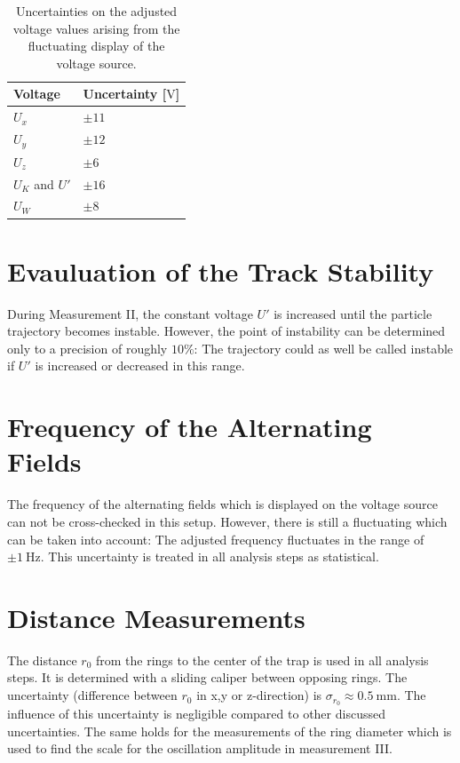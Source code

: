\documentclass[
	paper=A4,
	parskip=full,
	chapterprefix=true,
	11pt,
	headings=normal,
	bibliography=totoc,
	listof=totoc,
	titlepage=on,
]{scrreprt}
\begin{document}
\begin{table}[htbp]
	\centering
	\begin{tabular}{ 
			l
			l
		}
		\toprule
		Voltage & Uncertainty [$\si{\volt}$] \\ 
		\midrule
		$U_x$ & $\pm 11$  \\
		$U_y$ & $\pm 12$ \\
		$U_z$ & $\pm  6$ \\
		$U_K$ and $U'$ & $\pm 16$ \\
		$U_W$ & $\pm 8$ \\
		
		\bottomrule
	\end{tabular}
	\caption{Uncertainties on the adjusted voltage values arising from the fluctuating display of the voltage source.}
	\label{tbl:unc_fluctuation}
\end{table}

\section{Evauluation of the Track Stability}
During Measurement II, the constant voltage $U'$ is increased until the particle trajectory becomes instable. However, the point of instability can be determined only to a precision of roughly $10\%$: The trajectory could as well be called instable if $U'$ is increased or decreased in this range. 
 
\section{Frequency of the Alternating Fields}
The frequency of the alternating fields which is displayed on the voltage source can not be cross-checked in this setup. However, there is still a fluctuating which can be taken into account: The adjusted frequency fluctuates in the range of $\pm \SI{1}{\hertz}$. This uncertainty is treated in all analysis steps as statistical. 

\section{Distance Measurements}
The distance $r_0$ from the rings to the center of the trap is used in all analysis steps. It is determined with a sliding caliper between opposing rings. The uncertainty (difference between $r_0$ in x,y or z-direction) is $\sigma_{r_0} \approx \SI{0.5}{\milli \meter}$. The influence of this uncertainty is negligible compared to other discussed uncertainties. The same holds for the measurements of the ring diameter which is used to find the scale for the oscillation amplitude in measurement III.
\end{document}
